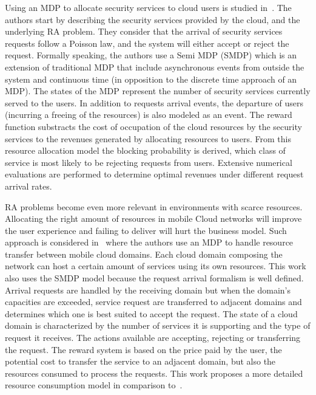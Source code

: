 Using an MDP to allocate security services to cloud users is studied in~\cite{Liang2011}.
The authors start by describing the security services provided by the cloud, and the underlying RA problem.
They consider that the arrival of security services requests follow a Poisson law, and the system will either accept or reject the request. Formally speaking, the authors use a Semi MDP (SMDP) which is an extension of traditional MDP that include asynchronous events from outside the system and continuous time (in opposition to the discrete time approach of an MDP).
The states of the MDP represent the number of security services currently served to the users. In addition to requests arrival events, the departure of users (incurring a freeing of the resources) is also modeled as an event. The reward function substracts the cost of occupation of the cloud resources by the security services to the revenues generated by allocating resources to users. 
From this resource allocation model the blocking probability is derived, \ie which class of service is most likely to be rejecting requests from users. Extensive numerical evaluations are performed to determine optimal revenues under different request arrival rates.

RA problems become even more relevant in environments with scarce resources.
Allocating the right amount of resources in mobile Cloud networks will improve the user experience and failing to deliver will hurt the business model.
Such approach is considered in~\cite{Liang2012} where the authors use an MDP to handle resource transfer between mobile cloud domains. Each cloud domain composing the network can host a certain amount of services using its own resources. 
This work also uses the SMDP model because the request arrival formalism is well defined.
Arrival requests are handled by the receiving domain but when the domain's capacities are exceeded, service request are transferred to adjacent domains and determines which one is best suited to accept the request.
The state of a cloud domain is characterized by the number of services it is supporting and the type of request it receives.
The actions available are accepting, rejecting or transferring the request.
The reward system is based on the price paid by the user, the potential cost to transfer the service to an adjacent domain, but also the resources consumed to process the requests. 
This work proposes a more detailed resource consumption model in comparison to~\cite{Liang2011}.


